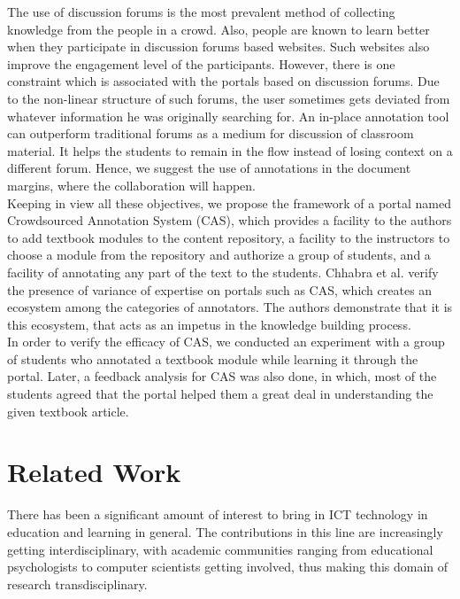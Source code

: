 \documentclass{llncs}
\begin{document}
The use of discussion forums is the most prevalent method of collecting knowledge from the people in a crowd. Also, people are known to learn better when they participate in discussion forums based websites\cite{Davies2005}\cite{Deslauriers2011a}. Such websites also improve the engagement level of the participants\cite{Palmer2008}. However, there is one constraint which is associated with the portals based on discussion forums. Due to the non-linear structure of such forums, the user sometimes gets deviated from whatever information he was originally searching for\cite{Thomas2002}. An in-place annotation tool can outperform traditional forums as a medium for discussion of classroom material. It helps the students to remain in the flow instead of losing context on a different forum\cite{Cadiz2000}\cite{Zyto2012}. Hence, we suggest the use of annotations in the document margins, where the collaboration will happen. \\
Keeping in view all these objectives, we propose the framework of a portal named Crowdsourced Annotation System (CAS), which provides a facility to the authors to add textbook modules to the content repository, a facility to the instructors to choose a module from the repository and authorize a group of students, and a facility of annotating any part of the text to the students. Chhabra et al.\cite{chhabra2015presence} verify the presence of variance of expertise on portals such as CAS, which creates an ecosystem among the categories of annotators. The authors demonstrate that it is this ecosystem, that acts as an impetus in the knowledge building process. \\
In order to verify the efficacy of CAS, we conducted an experiment with a group of students who annotated a textbook module while learning it through the portal. Later, a feedback analysis for CAS was also done, in which, most of the students agreed that the portal helped them a great deal in understanding the given textbook article.
\section{Related Work}\label{sec:related}
There has been a significant amount of interest to bring in ICT technology in education and learning in general. The contributions in this line are increasingly getting interdisciplinary, with academic communities ranging from educational psychologists\cite{Cress2008} to computer scientists\cite{Zyto2012} getting involved, thus making this domain of research transdisciplinary.
\end{document}
